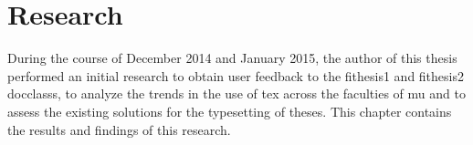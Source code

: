 \chapter{Research}
During the course of December 2014 and January 2015, the author of this thesis performed an initial research to obtain user feedback to the fithesis1 and fithesis2 \glspl{docclass}, to analyze the trends in the use of \gls{tex} across the faculties of \gls{mu} and to assess the existing solutions for the typesetting of theses. This chapter contains the results and findings of this research.

  
  
  